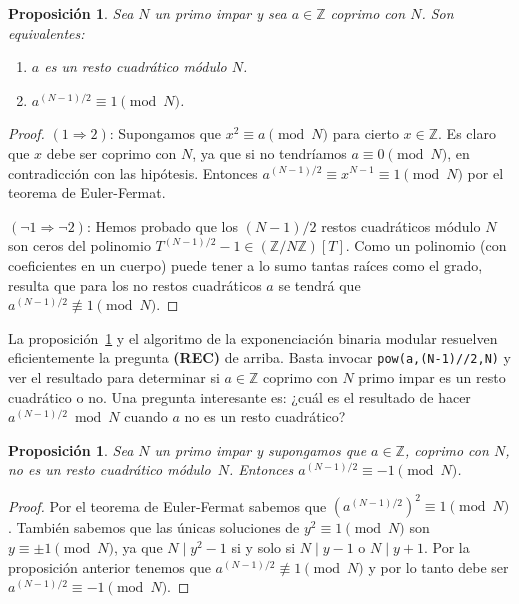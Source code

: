 \documentclass[a4paper, 11pt]{article}
\newcommand{\ZZ}{\mathbb{Z}}
\theoremstyle{plain}
\newtheorem{prop}[teor]{Proposición}
\theoremstyle{definition}
\begin{document}
\begin{prop}\label{prop:sqr1}
Sea $N$ un primo impar y sea $a\in\ZZ$ coprimo con $N$. Son equivalentes:
\begin{enumerate}
\item $a$ es un resto cuadrático módulo $N$.
\item $a^{(N-1)/2}\equiv 1\pmod{N}$.
\end{enumerate}
\end{prop}
\begin{proof}
$(1\Rightarrow2)$: Supongamos que $x^2\equiv a\pmod{N}$ para cierto $x\in\ZZ$.
Es claro que $x$ debe ser coprimo con $N$, ya que si no tendríamos
$a\equiv 0\pmod{N}$, en contradicción con las hipótesis.
Entonces $a^{(N-1)/2}\equiv x^{N-1}\equiv 1\pmod{N}$ por el teorema de Euler-Fermat.

$(\neg1\Rightarrow\neg2)$: Hemos probado que los $(N-1)/2$ restos cuadráticos módulo
$N$ son ceros del polinomio $T^{(N-1)/2}-1\in(\ZZ/N\ZZ)[T]$. Como un polinomio (con
coeficientes en un cuerpo) puede tener a lo sumo tantas raíces como el grado,
resulta que para los no restos cuadráticos $a$ se tendrá que
$a^{(N-1)/2}\not\equiv 1\pmod{N}$.
\end{proof}

La proposición~\ref{prop:sqr1} y el algoritmo de la exponenciación binaria modular
resuelven eficientemente la pregunta \textbf{(REC)} de arriba. Basta invocar \texttt{pow(a,(N-1)//2,N)} y ver el resultado para determinar si $a\in\ZZ$
coprimo con $N$ primo impar es un resto cuadrático o no. Una pregunta interesante es:
¿cuál es el resultado de hacer $a^{(N-1)/2}\bmod{N}$ cuando $a$ no es un resto
cuadrático?

\begin{prop}\label{prop:sqr2}
Sea $N$ un primo impar y supongamos que $a\in\ZZ$, coprimo con $N$, no es un resto
cuadrático módulo~$N$. Entonces $a^{(N-1)/2}\equiv-1\pmod{N}$.
\end{prop}
\begin{proof}
Por el teorema de Euler-Fermat sabemos que $\left(a^{(N-1)/2}\right)^2\equiv
1\pmod{N}$. También sabemos que las únicas soluciones de $y^2\equiv1\pmod{N}$ son
$y\equiv\pm1\pmod{N}$, ya que $N\mid y^2-1$ si y solo si $N\mid y-1$ o $N\mid y+1$.
Por la proposición anterior tenemos que $a^{(N-1)/2}\not\equiv1\pmod{N}$ y por lo
tanto debe ser $a^{(N-1)/2}\equiv-1\pmod{N}$.
\end{proof}
\end{document}
